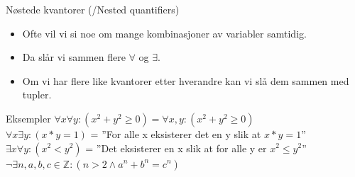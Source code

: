 \begin{frame}{Nøstede kvantorer (/Nested quantifiers)}
    \begin{itemize}
        \item Ofte vil vi si noe om mange kombinasjoner av variabler samtidig.
        \item Da slår vi sammen flere $\forall$ og $\exists$.
        \item Om vi har flere like kvantorer etter hverandre kan vi slå dem sammen med tupler.
    \end{itemize}
    
    \begin{block}{Eksempler}
        $\forall x \forall y : (x^2 + y^2 \geq 0) = \forall x, y : (x^2 + y^2 \geq 0)$ \\
        $\forall x \exists y : (x * y = 1)$ = ''For alle x eksisterer det en y slik at $x * y = 1$'' \\
        $\exists x \forall y : (x^2 < y^2)$ = ''Det eksisterer en x slik at for alle y er $x^2 \leq y^2$''\\
        $\lnot \exists n, a, b, c \in \mathbb{Z} : (n > 2 \land a^n + b^n = c^n)$\\
    \end{block}
\end{frame}

